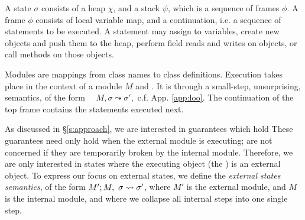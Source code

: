 A \Loo state $\sigma$ consists of a 
heap $\chi$, and a  {stack $\psi$, which is a sequence of frames $\phi$}.
A frame $\phi$ consists of
local variable map, and a continuation, i.e. a sequence of statements to be executed.
 A statement may assign to variables, create new objects and push them to the heap, 
perform field reads and writes on objects,  or
 call methods on those objects. 

 Modules are mappings
from class names to class definitions. 
Execution takes place in the context of  a module $M$ and   .
It is %
  through a small-step, unsurprising, semantics, of the form \ \ 
   $M, \sigma \leadsto \sigma'$,\  c.f. App. \ref{app:loo}.
The   continuation of the top frame contains the statements  %
executed next.
 
As discussed in \S \ref{s:approach}, we are interested in guarantees which hold
 These guarantees need only hold 
when the external module is executing; \scd{we} are not concerned if they are
temporarily broken by the internal module. Therefore, we are only interested in states where the
executing object (the \prg{this}) is an external object. 
To express our focus on external states, we define the  \emph{external states semantics}, of the form 
$M' ; M,\ \sigma \leadsto \sigma'$, where $M'$ is the external
module, and $M$ is the internal module, and where we
collapse all internal steps into one single step.

 

